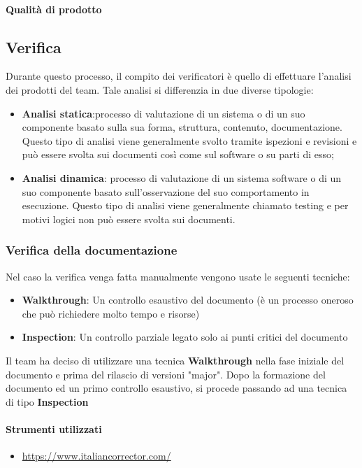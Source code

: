 \documentclass[12pt]{article}
\begin{document}
\paragraph{Qualità di prodotto} 

\subsection{Verifica}
Durante questo processo, il compito dei verificatori è quello di effettuare l’analisi dei prodotti del team.
Tale analisi si differenzia in due diverse tipologie:
\begin{itemize}
    \item \textbf{Analisi statica}:processo di valutazione di un sistema o di un suo componente basato sulla sua
    forma, struttura, contenuto, documentazione. Questo tipo di analisi viene generalmente svolto
    tramite ispezioni e revisioni e può essere svolta sui documenti così come sul software o su parti
    di esso;
    
    \item \textbf{Analisi dinamica}: processo di valutazione di un sistema software o di un suo componente
    basato sull’osservazione del suo comportamento in esecuzione. Questo tipo di analisi viene
    generalmente chiamato testing e per motivi logici non può essere svolta sui documenti.
\end{itemize}


\subsubsection{Verifica della documentazione}
Nel caso la verifica venga fatta manualmente vengono usate le seguenti tecniche:
\begin{itemize}
    \item \textbf{Walkthrough}: Un controllo esaustivo del documento (è un processo oneroso che può richiedere molto tempo e risorse)
    \item \textbf{Inspection}: Un controllo parziale legato solo ai punti critici del documento
\end{itemize}
Il team ha deciso di utilizzare una tecnica \textbf{Walkthrough} nella fase iniziale del documento e prima del rilascio di versioni "major".
Dopo la formazione del documento ed un primo controllo esaustivo, si procede passando ad una tecnica di tipo \textbf{Inspection}
\paragraph{Strumenti utilizzati}
\begin{itemize}
	\item \url{https://www.italiancorrector.com/}
\end{itemize}
\end{document}
